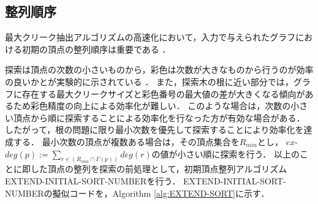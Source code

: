 \subsection{整列順序}
最大クリーク抽出アルゴリズムの高速化において，入力で与えられたグラフにおける初期の頂点の整列順序は重要である
\cite{富田悦次1985最大クリーク抽出の効率化手法とその実験的評価}
．

探索は頂点の次数の小さいものから，彩色は次数が大きなものから行うのが効率の良いかとが実験的に示されている
\cite{tomita2007efficient}
\cite{富田悦次1985最大クリーク抽出の効率化手法とその実験的評価}
．%
また，探索木の根に近い部分では，グラフに存在する最大クリークサイズと彩色番号の最大値の差が大きくなる傾向があるため彩色精度の向上による効率化が難しい．
このような場合は，次数の小さい頂点から順に探索することによる効率化を行なった方が有効な場合がある．
したがって，根の問題に限り最小次数を優先して探索することにより効率化を達成する．
最小次数の頂点が複数ある場合は，その頂点集合を$R_{min}$とし，
$ex$-$deg (p) := 
\sum_{ r \in ( R_{min} \cap \Gamma(p) ) }  deg(r) $の値が小さい順に探索を行う． 
以上のことに即した頂点の整列を探索の前処理として，初期頂点整列アルゴリズムEXTEND-INITIAL-SORT-NUMBERを行う．
EXTEND-INITIAL-SORT-NUMBERの擬似コードを，Algorithm \ref{alg:EXTEND-SORT}に示す．

